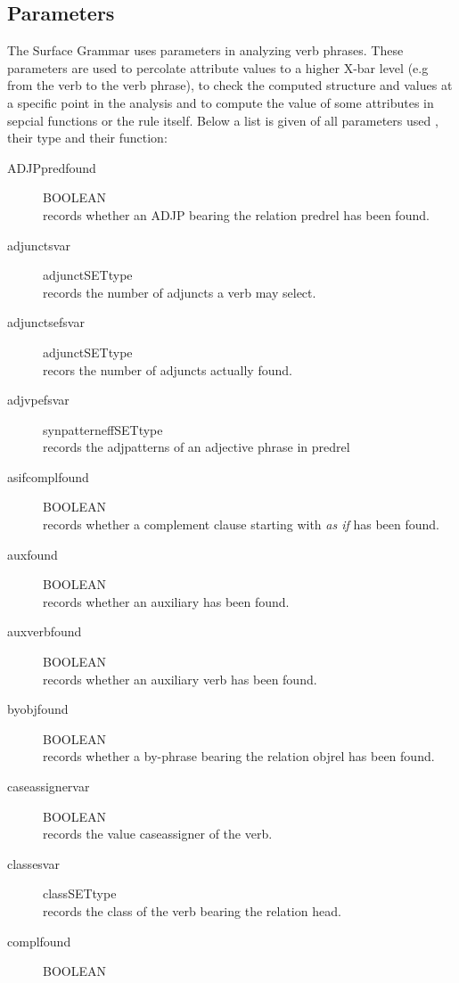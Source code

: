 \subsection{Parameters}
The Surface Grammar uses parameters in analyzing verb phrases. These 
parameters are used to percolate attribute values to a 
higher X-bar level (e.g from the verb to the verb phrase), 
to check the computed structure and values at a 
specific point in the analysis and to compute the value of some attributes in 
sepcial functions or the rule itself. 
Below a list is given of all parameters used , their 
type and their function:\\
\begin{description}
\item [ADJPpredfound      ] BOOLEAN\\
records whether an ADJP bearing the relation predrel has been found.
\item [adjunctsvar        ] adjunctSETtype\\
records the number of adjuncts a verb may select.
\item [adjunctsefsvar     ] adjunctSETtype\\
recors the number of adjuncts actually found.
\item [adjvpefsvar        ] synpatterneffSETtype\\
records the adjpatterns of an adjective phrase in predrel
\item [asifcomplfound     ] BOOLEAN\\
records whether a complement clause starting with {\em as if} has been found.
\item [auxfound           ] BOOLEAN \\ 
records whether an auxiliary has been found.
\item [auxverbfound       ] BOOLEAN \\
records whether an auxiliary verb has been found.
\item [byobjfound         ] BOOLEAN\\
records whether a by-phrase bearing the relation objrel has been found.
\item [caseassignervar    ] BOOLEAN\\
records the value caseassigner of the verb.
\item [classesvar         ] classSETtype\\
records the class of the verb bearing the relation head.
\item [complfound         ] BOOLEAN\\

\end{description}

